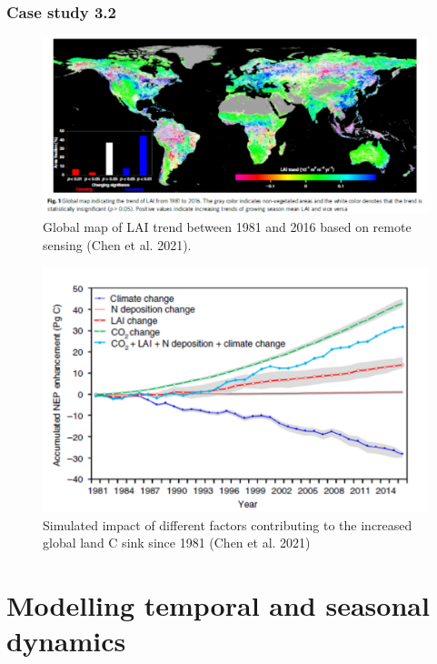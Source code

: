 \documentclass[12pt,oneside]{book}
\begin{document}
\subsection{Case study 3.2}\label{case-study-3.2}

\begin{figure}

{\centering \includegraphics[width=0.8\linewidth]{figures/chap3/f334_chen1} 

}

\caption{Global map of LAI trend between 1981 and 2016 based on remote sensing (Chen et al. 2021).}\label{fig:f334}
\end{figure}

\begin{figure}

{\centering \includegraphics[width=0.8\linewidth]{figures/chap3/f335_chen2} 

}

\caption{Simulated impact of different factors contributing to the increased global land C sink since 1981 (Chen et al. 2021) }\label{fig:f335}
\end{figure}

\chapter{Modelling temporal and seasonal
dynamics}\label{modelling-temporal-and-seasonal-dynamics}
\end{document}
